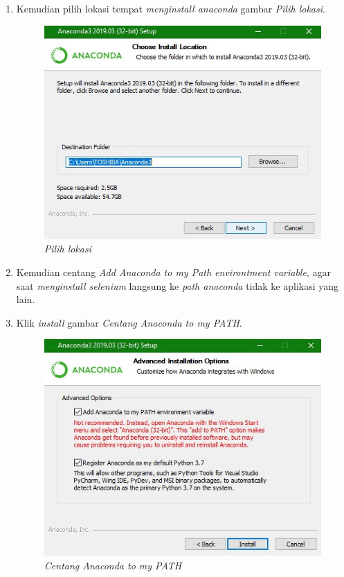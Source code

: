 \begin{enumerate}
\item Kemudian pilih lokasi tempat \textit{menginstall anaconda}
 gambar \textit{Pilih lokasi}.

\begin{figure}[!htbp]
    \centering
    \includegraphics[scale=0.5]{figures/e.jpg}
    \caption{\textit{Pilih lokasi}}
    \label{Figureanaconda5}
\end{figure}

\item Kemudian centang \textit{Add Anaconda to my Path environtment variable}, agar saat \textit{menginstall selenium} langsung ke \textit{path anaconda} tidak ke aplikasi yang lain.
\item Klik \textit{install}
 gambar \textit{Centang Anaconda to my PATH}.

\begin{figure}[!htbp]
    \centering
    \includegraphics[scale=0.5]{figures/f.jpg}
    \caption{\textit{Centang Anaconda to my PATH}}
    \label{Figureanaconda6}
\end{figure}


\end{enumerate}

